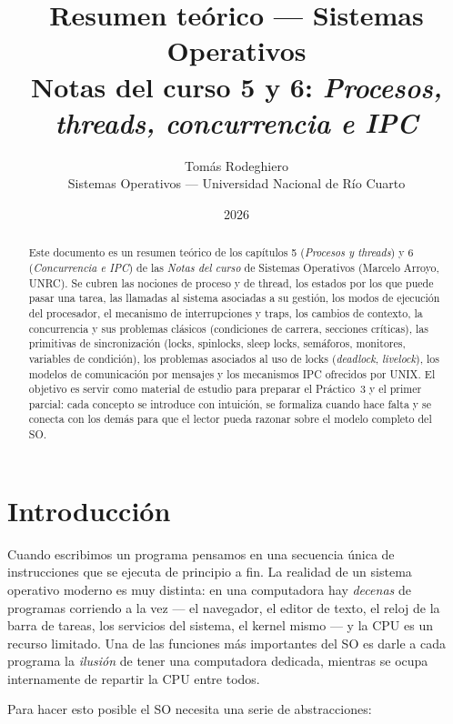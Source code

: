 \documentclass[11pt,a4paper]{article}
\title{
    \vspace{-2.5em}
    \textbf{Resumen teórico --- Sistemas Operativos} \\[0.3em]
    \large Notas del curso 5 y 6: \emph{Procesos, threads, concurrencia e IPC}
}
\author{
    Tomás Rodeghiero \\
    \small Sistemas Operativos --- Universidad Nacional de Río Cuarto
}
\date{2026}
\begin{document}
\maketitle

\begin{abstract}
\noindent
Este documento es un resumen teórico de los capítulos 5
(\emph{Procesos y threads}) y 6 (\emph{Concurrencia e IPC}) de las
\emph{Notas del curso} de Sistemas Operativos (Marcelo Arroyo, UNRC).
Se cubren las nociones de proceso y de thread, los estados por los que
puede pasar una tarea, las llamadas al sistema asociadas a su gestión,
los modos de ejecución del procesador, el mecanismo de interrupciones
y traps, los cambios de contexto, la concurrencia y sus problemas
clásicos (condiciones de carrera, secciones críticas), las primitivas
de sincronización (locks, spinlocks, sleep locks, semáforos, monitores,
variables de condición), los problemas asociados al uso de locks
(\emph{deadlock}, \emph{livelock}), los modelos de comunicación por
mensajes y los mecanismos IPC ofrecidos por UNIX. El objetivo es servir
como material de estudio para preparar el Práctico~3 y el primer
parcial: cada concepto se introduce con intuición, se formaliza cuando
hace falta y se conecta con los demás para que el lector pueda razonar
sobre el modelo completo del SO.
\end{abstract}

\tableofcontents
\bigskip

\section{Introducción}

Cuando escribimos un programa pensamos en una secuencia única de
instrucciones que se ejecuta de principio a fin. La realidad de un
sistema operativo moderno es muy distinta: en una computadora hay
\emph{decenas} de programas corriendo a la vez --- el navegador, el
editor de texto, el reloj de la barra de tareas, los servicios del
sistema, el kernel mismo --- y la CPU es un recurso limitado. Una de
las funciones más importantes del SO es darle a cada programa la
\emph{ilusión} de tener una computadora dedicada, mientras se ocupa
internamente de repartir la CPU entre todos.

Para hacer esto posible el SO necesita una serie de abstracciones:
\end{document}
